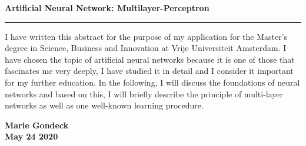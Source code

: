 \documentclass[a4paper,oneside, 11pt,abstract=on, titlepage=true,BCOR=8.25mm, nenglish]{scrreprt}
\begin{document}
\thispagestyle{empty}
\begin{center}
\LARGE\textbf{\textrm{Artificial Neural Network: Multilayer-Perceptron}}\\
\vspace{1cm}
 	\hrule
 	\vspace{0.2cm}
\end{center}

    I have written this abstract for the purpose of my application for the Master's degree in Science, Business and Innovation at Vrije Universiteit Amsterdam. I have chosen the topic of artificial neural networks because it is one of those that fascinates me very deeply, I have studied it in detail and I consider it important for my further education. In the following, I will discuss the foundations of neural networks and based on this, I will briefly describe the principle of multi-layer networks as well as one well-known learning procedure.
    
    \vspace{0.4cm}
    
 
  
 \begin{center}
     \textbf{Marie Gondeck \\ May 24 2020}
 \end{center}


\newpage
\tableofcontents
    \thispagestyle{empty}

\newpage
\pagestyle{fancy}



\printbibliography %
\end{document}
